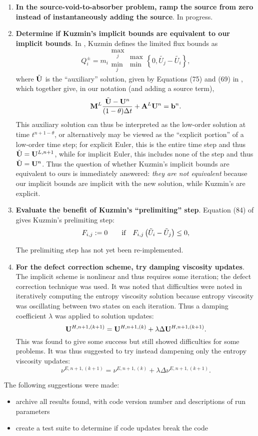\begin{enumerate}
\item \textbf{In the source-void-to-absorber problem, ramp the source from zero instead of
instantaneously adding the source}.
In progress.

\item \textbf{Determine if Kuzmin's implicit bounds are equivalent to our implicit bounds}.
In \cite{kuzmin_FCT}, Kuzmin defines the limited flux bounds as
\[
  Q_i^\pm=m_i\substack{\max_j\\\min_j}\substack{\max\\\min}
    \left\{0,\tilde{U_j}-\tilde{U_i}\right\},
\]
where $\tilde{\mathbf{U}}$ is the ``auxiliary'' solution, given by Equations (75) and (69)
in \cite{kuzmin_FCT}, which together give, in our notation (and adding a source term),
\[
  \mathbf{M}^L\frac{\tilde{\mathbf{U}}-\mathbf{U}^n}{(1-\theta)\Delta t} + \mathbf{A}^L\mathbf{U}^n = \mathbf{b}^n.
\]
This auxiliary solution can thus be interpreted as the low-order solution at time
$t^{n+1-\theta}$, or alternatively may be viewed as the ``explicit portion'' of
a low-order time step; for explicit Euler, this is the entire time step and thus
$\tilde{\mathbf{U}}=\mathbf{U}^{L,n+1}$, while for implicit Euler, this includes none of the step
and thus $\tilde{\mathbf{U}}=\mathbf{U}^{n}$. Thus the question of whether Kuzmin's implicit bounds are
equivalent to ours is immediately answered: \emph{they are not equivalent} because
our implicit bounds are implicit with the new solution, while Kuzmin's are
explicit.

\item \textbf{Evaluate the benefit of Kuzmin's ``prelimiting'' step}.
Equation (84) of \cite{kuzmin_FCT} gives Kuzmin's prelimiting step:
\[
  F_{i,j} := 0 \qquad \mbox{if}\quad F_{i,j} \left(\tilde{U}_i-\tilde{U}_j\right)\leq 0,
\]

The prelimiting step has not yet been re-implemented.

\item \textbf{For the defect correction scheme, try damping viscosity updates}.
The implicit scheme is nonlinear and thus requires some iteration; the defect
correction technique was used. It was noted that difficulties were noted in
iteratively computing the entropy viscosity solution because entropy viscosity
was oscillating between two states on each iteration. Thus a damping coefficient
$\lambda$ was applied to solution updates:
\[
  \mathbf{U}^{H,n+1,(k+1)} = \mathbf{U}^{H,n+1,(k)} + \lambda\Delta\mathbf{U}^{H,n+1,(k+1)}.
\]
This was found to give some success but still showed difficulties for some
problems. It was thus suggested to try instead dampening only the entropy viscosity updates:
\[
  \nu^{E,n+1,(k+1)} = \nu^{E,n+1,(k)} + \lambda\Delta\nu^{E,n+1,(k+1)}.
\]

\end{enumerate}

The following suggestions were made:
\begin{itemize}
  \item archive all results found, with code version number and descriptions of run parameters
  \item create a test suite to determine if code updates break the code
\end{itemize}

